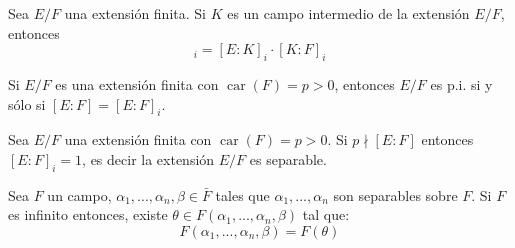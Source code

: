 \documentclass[12pt]{report}
\theoremstyle{largebreak}
\DeclareMathOperator{\car}{car}
\begin{document}
    \begin{obs}
        Sea $E/F$ una extensión finita. Si $K$ es un campo intermedio de la extensión $E/F$, entonces
        \begin{equation*}
            [E:F]_i=[E:K]_i\cdot[K:F]_i
        \end{equation*}
        
        Si $E/F$ es una extensión finita con $\car(F)=p>0$, entonces $E/F$ es p.i. si y sólo si $[E:F]=[E:F]_i$.
    \end{obs}

    \begin{obs}
        Sea $E/F$ una extensión finita con $\car(F)=p>0$. Si $p\nmid [E:F]$ entonces $[E:F]_i=1$, es decir la extensión $E/F$ es separable.
    \end{obs}

    \begin{propo}
        Sea $F$ un campo, $\alpha_1,...,\alpha_n,\beta\in\bar{F}$ tales que $\alpha_1,...,\alpha_n$ son separables sobre $F$. Si $F$ es infinito entonces, existe $\theta\in F(\alpha_1,...,\alpha_n,\beta)$ tal que:
        \begin{equation*}
            F(\alpha_1,...,\alpha_n,\beta)=F(\theta)
        \end{equation*}
    \end{propo}
\end{document}
